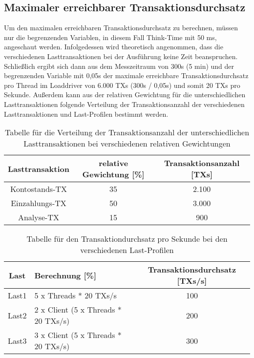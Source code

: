 \subsection{Maximaler erreichbarer Transaktionsdurchsatz}\label{subsec:maximaler-erreichbarer-transaktionsdurchsatz}
Um den maximalen erreichbaren Transaktionsdurchsatz zu berechnen, müssen nur die begrenzenden Variablen, in diesem Fall Think-Time mit 50 ms, angeschaut werden.
Infolgedessen wird theoretisch angenommen, dass die verschiedenen Lasttransaktionen bei der Ausführung keine Zeit beanspruchen.
Schließlich ergibt sich dann aus dem Messzeitraum von 300s (5 min) und der begrenzenden Variable mit 0,05s der maximale erreichbare Transaktionsdurchsatz pro Thread im Loaddriver von 6.000 TXs (300s / 0,05s) und somit 20 TXs pro Sekunde.
Außerdem kann aus der relativen Gewichtung für die unterschiedlichen Lasttransaktionen folgende Verteilung der Transaktionsanzahl der verschiedenen Lasttransaktionen und Last-Profilen bestimmt werden.
\begin{table}[h!]
    \centering
    \begin{tabular}{|c|c|c|}
        \hline
        Lasttransaktion & relative Gewichtung [\%] & Transaktionsanzahl [TXs] \\  \hline
        Kontostands-TX & 35 & 2.100 \\ \hline
        Einzahlungs-TX & 50 & 3.000 \\ \hline
        Analyse-TX & 15 & 900 \\ \hline
    \end{tabular}
    \caption{Tabelle für die Verteilung der Transaktionsanzahl der unterschiedlichen Lasttransaktionen bei verschiedenen relativen Gewichtungen}
    \label{tab:1}
\end{table}

\begin{table}[h!]
    \centering
    \begin{tabular}{|c|l|c|}
        \hline
        Last & Berechnung [\%] & Transaktionsdurchsatz [TXs/s] \\  \hline
        Last1 & 5 x Threads * 20 TXs/s & 100 \\ \hline
        Last2 & 2 x Client (5 x Threads * 20 TXs/s) & 200 \\ \hline
        Last3 & 3 x Client (5 x Threads * 20 TXs/s) & 300 \\ \hline
    \end{tabular}
    \caption{Tabelle für den Transaktiondurchsatz pro Sekunde bei den verschiedenen Last-Profilen}
    \label{tab:2}
\end{table}
